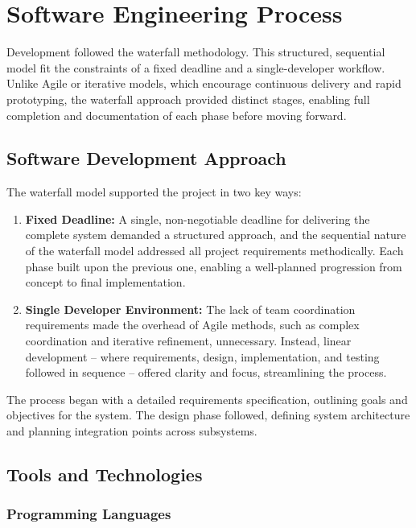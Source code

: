 \chapter{Software Engineering Process}
\label{chapter:sep}


Development followed the waterfall methodology\cite{royce1987managing}. This structured, sequential model fit the constraints of a fixed deadline and a single-developer workflow. Unlike Agile or iterative models\cite{atlassian2025agile}, which encourage continuous delivery and rapid prototyping, the waterfall approach provided distinct stages, enabling full completion and documentation of each phase before moving forward.

\section{Software Development Approach}

The waterfall model supported the project in two key ways:
\begin{enumerate}
	\item \textbf{Fixed Deadline:} A single, non-negotiable deadline for delivering the complete system demanded a structured approach, and the sequential nature of the waterfall model addressed all project requirements methodically. Each phase built upon the previous one, enabling a well-planned progression from concept to final implementation.

	\item \textbf{Single Developer Environment:} The lack of team coordination requirements made the overhead of Agile methods, such as complex coordination and iterative refinement, unnecessary. Instead, linear development -- where requirements, design, implementation, and testing followed in sequence -- offered clarity and focus, streamlining the process.

\end{enumerate}

The process began with a detailed requirements specification, outlining goals and objectives for the system. The design phase followed, defining system architecture and planning integration points across subsystems.

\section{Tools and Technologies}

\subsection{Programming Languages}

